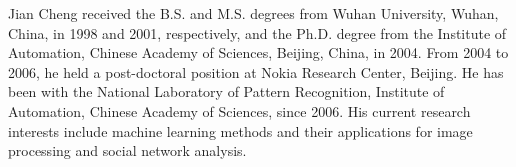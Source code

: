 \documentclass[journal,transmag]{IEEEtran}
\begin{document}
\begin{IEEEbiography}{Jian Cheng}
  received the B.S. and M.S. degrees from Wuhan University, Wuhan, China, in 1998 and 2001, 
  respectively, and the Ph.D. degree from the Institute of Automation, Chinese Academy of Sciences, Beijing, China, 
  in 2004. From 2004 to 2006, he held a post-doctoral position at Nokia Research Center, Beijing. 
  He has been with the National Laboratory of Pattern Recognition, Institute of Automation, Chinese Academy of Sciences, since 2006. 
  His current research interests include machine learning methods and their applications for image processing and social network analysis.
\end{IEEEbiography}




\end{document}
